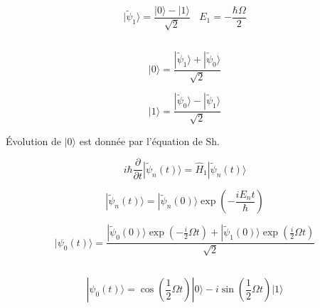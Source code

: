 \documentclass[a4paper,12pt]{article}
\begin{document}
\begin{equation}\label{key}
	|\tilde \psi_1\rangle = \frac{|0\rangle - |1\rangle}{\sqrt2}\ \ \ \ E_1 =- \frac{\hbar\Omega}{2}
\end{equation}

\subsection{}

\begin{equation}\label{key}
	|0\rangle = \frac{|\tilde \psi_1\rangle + |\tilde \psi_0\rangle}{\sqrt2}
\end{equation}

\begin{equation}\label{key}
	|1\rangle = \frac{|\tilde \psi_0\rangle - |\tilde \psi_1\rangle}{\sqrt2}
\end{equation}

Évolution de $|0\rangle$ est donnée par l'équation de Sh.

\begin{equation}\label{key}
	i\hbar\frac{\partial}{\partial t}|\tilde \psi_n(t)\rangle = \hat H_1|\tilde \psi_n(t)\rangle
\end{equation}

\begin{equation}\label{key}
	|\tilde \psi_n(t)\rangle = |\tilde \psi_n(0)\rangle \exp\left(-\frac{iE_nt}{\hbar}\right)
\end{equation}

\begin{equation}\label{key}
	|\psi_0(t)\rangle = \frac{|\tilde \psi_0(0)\rangle \exp\left(-{\frac i 2\Omega t}\right) + |\tilde \psi_1(0)\rangle \exp\left({\frac i 2\Omega t}\right)}{\sqrt 2}
\end{equation}



\subsection{}

\begin{equation}\label{key}
	|\psi_0(t)\rangle = \cos\left(\frac 12\Omega t\right)|0\rangle -i \sin\left(\frac 12\Omega t\right)|1\rangle
\end{equation}

\subsection{}
\end{document}
